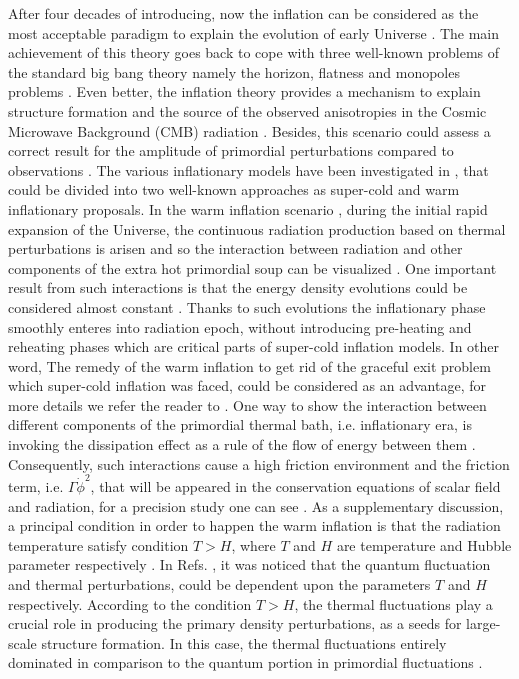 \documentclass[12pt]{revtex4}
\begin{document}
After four decades of introducing, {now the inflation  can}  be considered as the most  acceptable paradigm to explain  the evolution of early Universe \cite{Sta80,Gut81,Lin82,Lin83,Lin86a,Lin86b,Alb}. The main {achievement} of this  theory goes back to cope with three well-known problems of the standard big bang theory namely the horizon, flatness and  monopoles problems \cite{Lid00,Bas,Lem,Kin,Bau09,Bau14}. Even better,  {the} inflation theory  provides a mechanism to explain structure formation and the source of the observed anisotropies in the Cosmic Microwave Background (CMB) radiation \cite{Larson,Bennettc,Jarosik}. Besides, this scenario {could assess}  a correct result for the amplitude of primordial perturbations compared to observations
\cite{Bas,Liddle0,Langl,Lyth,Lyth1,Guth00,Lidsey97,Mukhanov-etal,Haidar0,Haidar,Haidar2}.
{The} various inflationary models have been investigated in \cite{Robert,Lid00}, that could be divided into {two well-known approaches}  as super-cold and warm inflationary proposals. In the warm inflation scenario \cite{Taylor,Oliveira,Oliveira2,6252603,62526,Bastero,Cid,Luca},{ during the initial rapid expansion of the Universe, the continuous radiation production based on thermal perturbations is arisen and so the interaction between  radiation and other components of the extra hot primordial soup can be visualized} \cite{Oliveira,Oliveira2}. One important result from such interactions is that the energy density  evolutions {could} be considered almost constant \cite{Taylor}. Thanks to such evolutions the inflationary phase smoothly enteres into radiation epoch, without{ introducing}  pre-heating and reheating phases which are critical parts of super-cold inflation models.  In other word,  {The remedy of the warm inflation } to get rid of the graceful exit problem  which super-cold inflation was faced,  could be considered as an advantage, for more details {we refer the reader to } \cite{Oliveira2,Antonella,warm,warm0,warm1,warm2,28,Karami1,Abol01}. One way to show the interaction between different components of the primordial thermal bath, i.e. inflationary era,  is invoking  the dissipation effect as a rule of the flow of energy between them \cite{Fang}. Consequently, such interactions cause  a high friction environment and  the friction term,{ i.e. $\Gamma {\dot{\phi}}^2$, that} will be appeared in the conservation equations of scalar field and radiation, for a precision study one can see \cite{Moss}. As a supplementary discussion, a principal condition in order to happen the warm inflation  is {that} the radiation temperature  satisfy condition $T>H$, where $T$ and $H$ are temperature and Hubble parameter respectively \cite{Herrera:2015aja,Herrera:2015a1,Herrera:2015a2}. In  Refs. \cite{warm,warm0,warm1,warm2}, it was noticed that the  quantum fluctuation and thermal perturbations{,} could be dependent upon the parameters $T$ and $H$ respectively. According to the condition $T>H$, the thermal fluctuations play a crucial role in producing  the primary density perturbations, as a seeds for large-scale structure formation. In this case, {the thermal fluctuations  entirely dominated in  comparison to the quantum portion in primordial fluctuations} \cite{warm0,warm1,warm2,Berera2}.\\
\end{document}
